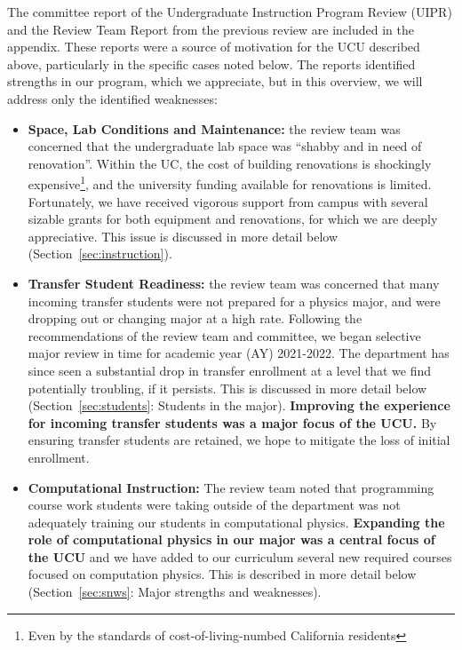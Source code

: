 \documentclass[12pt]{article}
\begin{document}
\noindent
The committee report of the Undergraduate Instruction Program Review
(UIPR) and the Review Team Report from the previous review are
included in the appendix.  These reports were a source of motivation
for the UCU described above, particularly in the specific cases noted
below.  The reports identified strengths in our program, which we
appreciate, but in this overview, we will address only the identified
weaknesses:
\begin{itemize}
 \item {\bf Space, Lab Conditions and Maintenance:} the review team
   was concerned that the undergraduate lab space was ``shabby and in
   need of renovation''.  Within the UC, the cost of building
   renovations is shockingly expensive\footnote{Even by the standards
     of cost-of-living-numbed California residents}, and the
   university funding available for renovations is limited.
   Fortunately, we have received vigorous support from campus with
   several sizable grants for both equipment and renovations, for
   which we are deeply appreciative.  This issue is discussed in more
   detail below (Section~\ref{sec:instruction}).
  
 \item {\bf Transfer Student Readiness:} the review team was concerned
   that many incoming transfer students were not prepared for a
   physics major, and were dropping out or changing major at a high
   rate.  Following the recommendations of the review team and
   committee, we began selective major review in time for academic
   year (AY) 2021-2022.  The department has since seen a substantial
   drop in transfer enrollment at a level that we find potentially
   troubling, if it persists.  This is discussed in more detail below
   (Section~\ref{sec:students}: Students in the major).  {\bf
     Improving the experience for incoming transfer students was a
     major focus of the UCU.}  By ensuring transfer students are
   retained, we hope to mitigate the loss of initial enrollment.

 \item {\bf Computational Instruction:} The review team noted that
   programming course work students were taking outside of the
   department was not adequately training our students in
   computational physics.  {\bf Expanding the role of computational
     physics in our major was a central focus of the UCU} and we have
   added to our curriculum several new required courses focused on
   computation physics.  This is described in more detail below
   (Section~\ref{sec:snws}: Major strengths and weaknesses).
  

\end{itemize}
\end{document}
